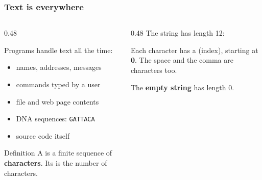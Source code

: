 \documentclass[aspectratio=169,10pt,compress]{beamer}
\begin{document}
\begin{frame}[t,fragile] \frametitle{Text is everywhere}
  \begin{columns}[T]
    \begin{column}{0.48\textwidth}
    
      Programs handle text all the time:
      \begin{itemize}\small
        
        \item names, addresses, messages
        
        \item commands typed by a user
        
        \item file and web page contents
        
        \item DNA sequences: \texttt{GATTACA}
        
        \item source code itself
      \end{itemize}
      
      \begin{block}{Definition}
        \small 
        A  is a finite sequence of \textbf{characters}.
        Its  is the number of characters.
      \end{block}
      
    \end{column}
    \begin{column}{0.48\textwidth}
      The string  has length 12:
      \vspace{0.6em}


      \vspace{0.6em}
      \small Each character has a  (index), starting at \textbf{0}.
      The space and the comma are characters too.

      \vspace{0.4em}
      The \textbf{empty string}  has length 0.
    \end{column}
  \end{columns}
\end{frame}
\end{document}
